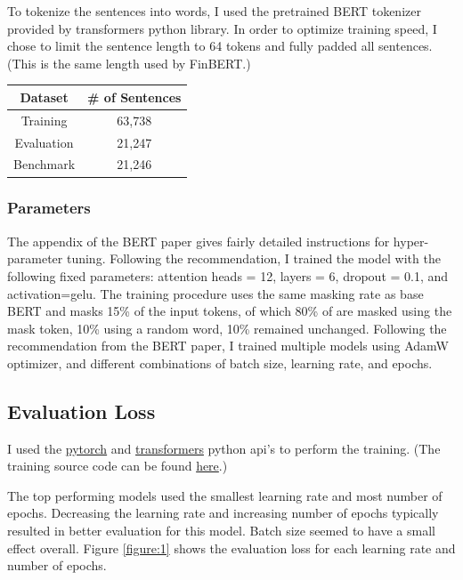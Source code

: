 \documentclass[11pt,a4paper]{article}
\begin{document}
To tokenize the sentences into words, I used the pretrained BERT tokenizer provided by transformers python library. In order to optimize training speed, I chose to limit the sentence length to 64 tokens and fully padded all sentences. (This is the same length used by FinBERT.)

\begin{center}
\begin{tabular}{ c c }
 Dataset & \# of Sentences \\
 \hline
 Training & 63,738  \\ 
 Evaluation & 21,247  \\  
 Benchmark & 21,246     
\end{tabular}
\end{center}

\subsubsection{Parameters}

The appendix of the BERT paper gives fairly detailed instructions for hyper-parameter tuning. Following the recommendation, I trained the model with the following fixed parameters: attention heads = 12, layers = 6, dropout = 0.1, and activation=gelu. The training procedure uses the same masking rate as base BERT and masks 15\% of the input tokens, of which 80\% of are masked using the mask token, 10\% using a random word, 10\% remained unchanged. Following the recommendation from the BERT paper,
I trained multiple models using AdamW optimizer, \citep{kingma2017adam} and different combinations of batch size, learning rate, and epochs.

\subsection{Evaluation Loss}

I used the \href{https://pytorch.org/}{pytorch} and \href{https://huggingface.co/transformers/}{transformers} python api's to perform the training. (The training source code can be found \href{https://github.com/jacksonargo/music-mlm}{here}.)

The top performing models used the smallest learning rate and most number of epochs. Decreasing the learning rate and increasing number of epochs typically resulted in better evaluation for this model. Batch size seemed to have a small effect overall. Figure \ref{figure:1} shows the evaluation loss for each learning rate and number of epochs.
\end{document}
